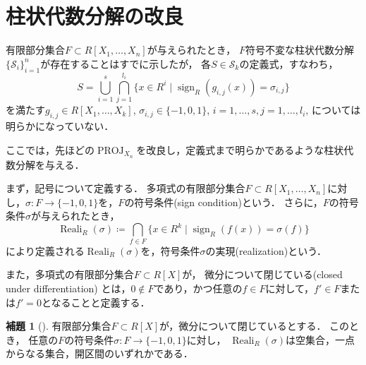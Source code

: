 \documentclass[uplatex, dvipdfmx]{jsarticle}
\numberwithin{equation}{section}
\newcommand{\map}[3]{{#1}\colon{#2}\rightarrow{#3}}
\DeclareMathOperator{\PROJ}{PROJ}
\DeclareMathOperator{\Reali}{Reali}
\DeclareMathOperator{\sign}{sign}
\theoremstyle{definition}
\newtheorem{lemma}[definition]{補題}
\begin{document}
\section{柱状代数分解の改良}\label{section:7}
有限部分集合$F \subset R[X_1, \dots, X_n]$が与えられたとき，
$F$符号不変な柱状代数分解$\{\mathcal{S}_i\}_{i=1}^n$が存在することはすでに示したが，
各$S \in \mathcal{S}_k$の定義式，すなわち，
\begin{equation}
     S = \bigcup_{i=1}^s \bigcap_{j=1}^{l_i} \{x \in R^i \mid \sign_R(g_{i,j}(x)) = \sigma_{i,j}\}
\end{equation}
を満たす$g_{i,j} \in R[X_1, \dots, X_k]$, $\sigma_{i,j} \in \{-1, 0, 1\}$, $i=1, \dots, s, j=1, \dots, l_i$, については明らかになっていない．

ここでは，先ほどの$\PROJ_{X_n}$を改良し，定義式まで明らかであるような柱状代数分解を与える．

まず，記号について定義する．
多項式の有限部分集合$F \subset R[X_1, \dots, X_n]$に対し，$\map{\sigma}{F}{\{-1,0,1\}}$を，$F$の符号条件(sign condition)という．
さらに，$F$の符号条件$\sigma$が与えられたとき，
\begin{equation}
     \Reali_R(\sigma)\coloneqq \bigcap_{f \in F}\{x \in R^k \mid \sign_R(f(x)) = \sigma(f)\}
\end{equation}
により定義される$\Reali_R(\sigma)$を，符号条件$\sigma$の実現(realization)という．

また，多項式の有限部分集合$F \subset R[X]$が，
微分について閉じている(closed under differentiation)
とは，$0 \not \in F$であり，かつ任意の$f \in F$に対して，$f' \in F$または$f'=0$となることと定義する．

\begin{lemma}[{\cite[Lemma 5.33]{MR2248869}}]\label{lemma:Thom}
     有限部分集合$F \subset R[X]$が，微分について閉じているとする．
     このとき， 任意の$F$の符号条件$\map{\sigma}{F}{\{-1,0,1\}}$に対し，
     $\Reali_R(\sigma)$は空集合，一点からなる集合，開区間のいずれかである．
\end{lemma}
\end{document}
